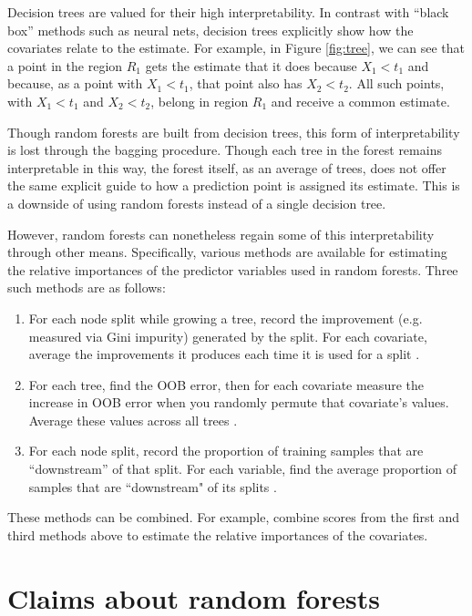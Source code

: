 \documentclass[10pt,a4paper]{article}
\begin{document}
Decision trees are valued for their high interpretability. In contrast with ``black box'' methods such as neural nets, decision trees explicitly show how the covariates relate to the estimate. For example, in Figure \ref{fig:tree}, we can see that a point in the region $R_1$ gets the estimate that it does because $X_1 < t_1$ and because, as a point with $X_1 < t_1$, that point also has $X_2<t_2$. All such points, with $X_1<t_1$ and $X_2<t_2$, belong in region $R_1$ and receive a common estimate.

Though random forests are built from decision trees, this form of interpretability is lost through the bagging procedure. Though each tree in the forest remains interpretable in this way, the forest itself, as an average of trees, does not offer the same explicit guide to how a prediction point is assigned its estimate. This is a downside of using random forests instead of a single decision tree.

However, random forests can nonetheless regain some of this interpretability through other means. Specifically, various methods are available for estimating the relative importances of the predictor variables used in random forests. Three such methods are as follows:
\begin{enumerate}
	\item For each node split while growing a tree, record the improvement (e.g. measured via Gini impurity) generated by the split. For each covariate, average the improvements it produces each time it is used for a split \citep{Hastie2009}.
	\item For each tree, find the OOB error, then for each covariate measure the increase in OOB error when you randomly permute that covariate's values. Average these values across all trees \citep{Breiman2001}.
	\item For each node split, record the proportion of training samples that are “downstream” of that split. For each variable, find the average proportion of samples that are ``downstream" of its splits \citep{scikit-learn}.
\end{enumerate}
These methods can be combined. For example, \citet{scikit-learn} combine scores from the first and third methods above to estimate the relative importances of the covariates.

\section{Claims about random forests}\label{claims}
\end{document}
